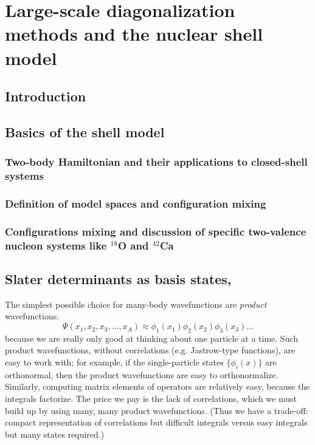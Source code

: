\chapter{Large-scale diagonalization methods and the nuclear shell model}

\section{Introduction}


\section{Basics of the shell model}


\subsection{Two-body Hamiltonian and their applications to closed-shell systems}

\subsection{Definition of model spaces and configuration mixing}
\subsection{Configurations mixing and discussion of specific two-valence nucleon systems like $^{18}$O and $^{42}$Ca}

\section{Slater determinants as basis states,}

The simplest possible choice for many-body wavefunctions are
\textit{product} wavefunctions.
\[ 
\Psi(x_1, x_2, x_3, \ldots, x_A) \approx \phi_1(x_1) \phi_2(x_2) \phi_3(x_3) \ldots
\]
because we are really only good  at thinking about one particle at a time. Such 
product wavefunctions, without correlations (e.g. Jastrow-type functions), are easy to 
work with; for example, if the single-particle states $\{ \phi_i(x)\}$ are orthonormal, then 
the product wavefunctions are easy to orthonormalize.   
Similarly, computing matrix elements of operators are relatively easy, because the 
integrals factorize.
The price we pay is the lack of correlations, which we must build up by using many, many product 
wavefunctions. (Thus we have a trade-off: compact representation of correlations but 
difficult integrals versus easy integrals but many states required.) 

